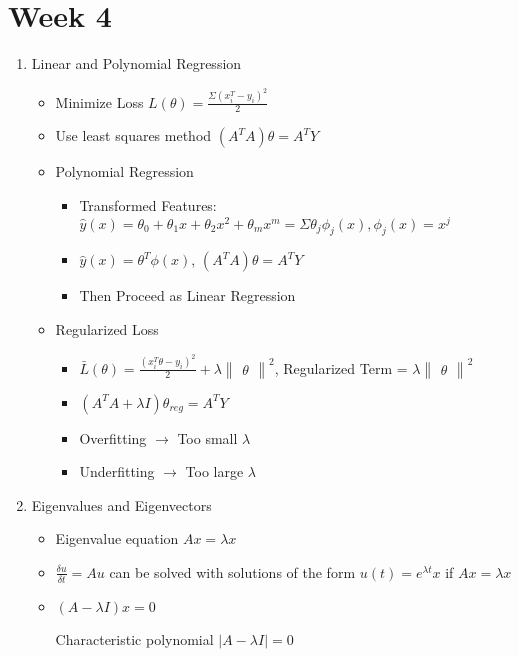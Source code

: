 \documentclass[a4paper]{article}
\begin{document}
\section{Week 4}
	\begin{enumerate}
		\item Linear and Polynomial Regression
		\begin{itemize}
			\item Minimize Loss $L(\theta) = \frac{\Sigma (x_{i}^{T} - y_{i})^{2}}{2}$
			\item Use least squares method $(A^{T}A)\theta = A^{T}Y$
			\item Polynomial Regression
			\begin{itemize}
				\item Transformed Features: $\hat{y}(x) = \theta_{0}+\theta_{1}x + \theta_{2}x^{2} + \theta_{m}x^{m} = \Sigma \theta_{j}\phi_{j}(x), \phi_{j}(x) = x^{j}$
				\item $\hat{y}(x) = \theta^{T}\phi(x)$, $(A^{T}A)\theta = A^{T}Y$
				\item Then Proceed as Linear Regression
			\end{itemize}
			\item Regularized Loss
			\begin{itemize}
				\item $\bar{L}(\theta) = \frac{(x^{T}_{i}\theta - y_{i})^{2}}{2} + \lambda \begin{Vmatrix} \theta \end{Vmatrix}^{2}$, Regularized Term = $\lambda \begin{Vmatrix} \theta \end{Vmatrix}^{2}$
				\item $(A^{T}A + \lambda I)\theta_{reg} = A^{T}Y$
				\item Overfitting $\rightarrow$ Too small $\lambda$
				\item Underfitting $\rightarrow$ Too large $\lambda$
			\end{itemize}
		\end{itemize}
		\item Eigenvalues and Eigenvectors
		\begin{itemize}
			\item Eigenvalue equation $Ax = \lambda x$
			\item $\frac{\delta u}{\delta t} = Au$ can be solved with solutions of the form $u(t) = e^{\lambda t}x$ if $Ax = \lambda x$
			\item $(A - \lambda I)x = 0$
			
			Characteristic polynomial $|A - \lambda I| = 0$
			

\end{itemize}
\end{enumerate}
\end{document}
